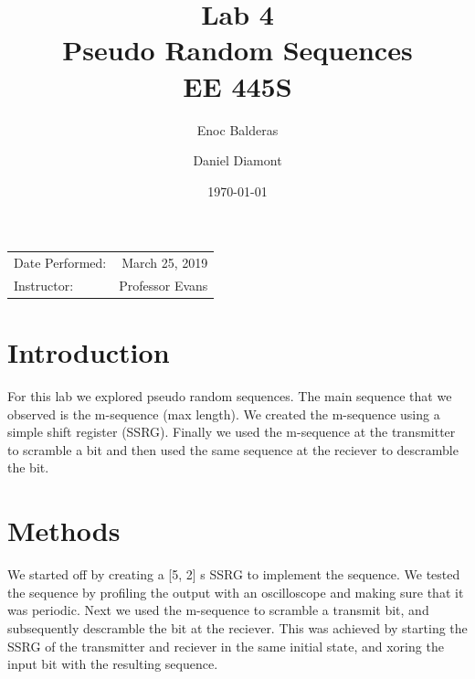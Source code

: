 \documentclass{article}
\title{Lab 4\\ Pseudo Random Sequences\\ EE 445S} %
\author{Enoc Balderas\\
        \and
        Daniel Diamont\\} %
\date{\today} %
\begin{document}
\maketitle %

\begin{center}
\begin{tabular}{l r}
Date Performed: & March 25, 2019 \\ %
Instructor: & Professor Evans %
\end{tabular}
\end{center}



\section{Introduction}

For this lab we explored pseudo random sequences. The main sequence that we
observed is the m-sequence (max length). We created the m-sequence using a
simple shift register (SSRG). Finally we used the m-sequence at the transmitter
to scramble a bit and then used the same sequence at the reciever to descramble
the bit.


\section{Methods}

We started off by creating a [5, 2] s SSRG to implement the sequence. We tested
the sequence by profiling the output with an oscilloscope and making sure that
it was periodic. Next we used the m-sequence to scramble a transmit bit, and
subsequently descramble the bit at the reciever. This was achieved by starting
the SSRG of the transmitter and reciever in the same initial state, and xoring
the input bit with the resulting sequence.
 
\end{document}
